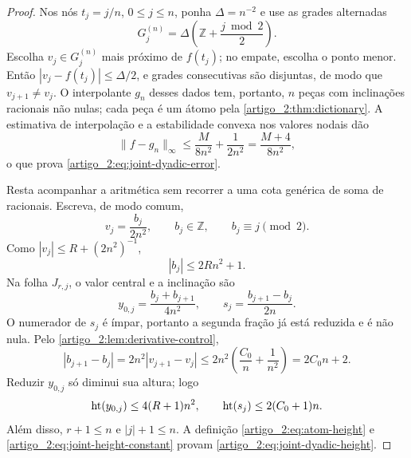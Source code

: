 \begin{proof}
Nos nós $t_j=j/n$, $0\le j\le n$, ponha $\Delta=n^{-2}$ e use as grades
alternadas
\begin{equation}
 G_j^{(n)}=\Delta\left(\mathbb Z+\frac{j\bmod2}{2}\right).
 \label{artigo_2:eq:joint-alternating-grid}
\end{equation}
Escolha $v_j\in G_j^{(n)}$ mais próximo de $f(t_j)$; no empate, escolha o
ponto menor. Então $|v_j-f(t_j)|\le\Delta/2$, e grades consecutivas são
disjuntas, de modo que $v_{j+1}\ne v_j$. O interpolante $g_n$ desses dados
tem, portanto, $n$ peças com inclinações racionais não nulas; cada peça é um
átomo pela \cref{artigo_2:thm:dictionary}. A estimativa de interpolação e a
estabilidade convexa nos valores nodais dão
\[
 \|f-g_n\|_\infty
 \le\frac{M}{8n^2}+\frac{1}{2n^2}
 =\frac{M+4}{8n^2},
\]
o que prova \eqref{artigo_2:eq:joint-dyadic-error}.

Resta acompanhar a aritmética sem recorrer a uma cota genérica de soma de
racionais. Escreva, de modo comum,
\begin{equation}
 v_j=\frac{b_j}{2n^2},\qquad b_j\in\mathbb Z,
 \qquad b_j\equiv j\pmod2.
 \label{artigo_2:eq:joint-common-denominator}
\end{equation}
Como $|v_j|\le R+(2n^2)^{-1}$,
\begin{equation}
 |b_j|\le2Rn^2+1.
 \label{artigo_2:eq:joint-numerator-bound}
\end{equation}
Na folha $J_{r,j}$, o valor central e a inclinação são
\begin{equation}
 y_{0,j}=\frac{b_j+b_{j+1}}{4n^2},
 \qquad
 s_j=\frac{b_{j+1}-b_j}{2n}.
 \label{artigo_2:eq:joint-atom-parameters}
\end{equation}
O numerador de $s_j$ é ímpar, portanto a segunda fração já está reduzida e é
não nula. Pelo \cref{artigo_2:lem:derivative-control},
\begin{equation}
 |b_{j+1}-b_j|
 =2n^2|v_{j+1}-v_j|
 \le2n^2\left(\frac{C_0}{n}+\frac1{n^2}\right)
 =2C_0n+2.
 \label{artigo_2:eq:joint-slope-numerator}
\end{equation}
Reduzir $y_{0,j}$ só diminui sua altura; logo
\begin{equation}
 \operatorname{ht}(y_{0,j})\le4(R+1)n^2,
 \qquad
 \operatorname{ht}(s_j)\le2(C_0+1)n.
 \label{artigo_2:eq:joint-parameter-heights}
\end{equation}
Além disso, $r+1\le n$ e $|j|+1\le n$. A definição
\eqref{artigo_2:eq:atom-height} e \eqref{artigo_2:eq:joint-height-constant} provam
\eqref{artigo_2:eq:joint-dyadic-height}.


\end{proof}
